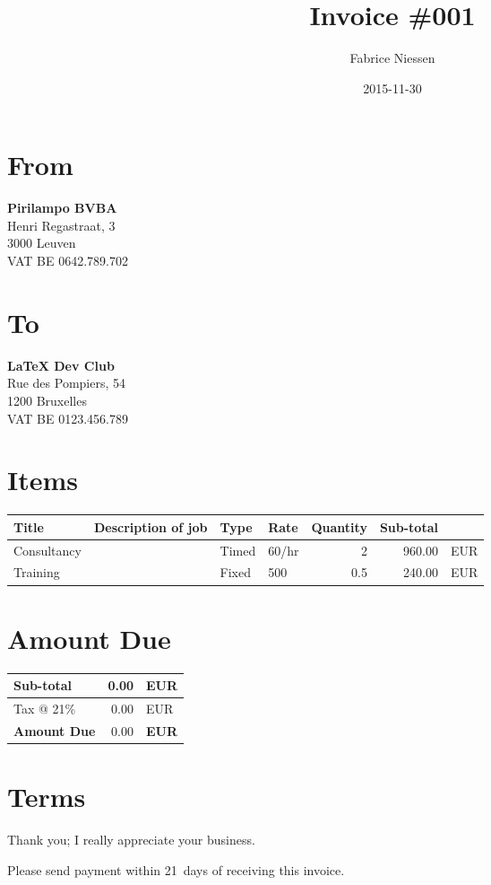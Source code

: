 \documentclass[11pt]{article}
\author{Fabrice Niessen}
\date{2015-11-30}
\title{Invoice \#001}
\begin{document}
\maketitle

\section*{From}
\label{sec:orgheadline1}

\textbf{Pirilampo BVBA} \\
Henri Regastraat, 3 \\
3000 Leuven \\
VAT BE 0642.789.702

\section*{To}
\label{sec:orgheadline2}

\textbf{\LaTeX{} Dev Club} \\
Rue des Pompiers, 54 \\
1200 Bruxelles \\
VAT BE 0123.456.789

\section*{Items}
\label{sec:orgheadline3}

\begin{center}
\label{tab:orgtable1}

\begin{tabular}{llllrrl}
Title & Description of job & Type & Rate & Quantity & Sub-total & \\
\hline
Consultancy &  & Timed & 60/hr & 2 & 960.00 & EUR\\
Training &  & Fixed & 500 & 0.5 & 240.00 & EUR\\
\end{tabular}
\end{center}

\section*{Amount Due}
\label{sec:orgheadline4}

\colorbox{prlp-gray}{\begin{minipage}{7.5cm}

\begin{center}
\begin{tabu}{Xrl}
Sub-total & 0.00 & EUR\\
\hline
Tax @ 21\% & 0.00 & EUR\\
\hline
\textbf{Amount Due} & 0.00 & \textbf{EUR}\\
\end{tabu}
\end{center}

\end{minipage}}

\section*{Terms}
\label{sec:orgheadline5}

Thank you; I really appreciate your business.

Please send payment within 21~days of receiving this invoice.
\end{document}

